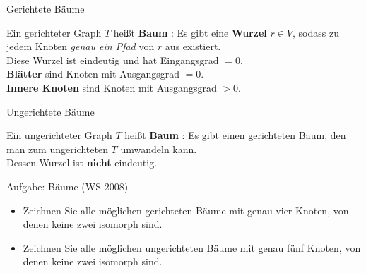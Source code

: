 \begin{frame}{Gerichtete Bäume}
	\begin{Definition}
		Ein gerichteter Graph $T$ heißt \textbf{Baum} :{\Gdw} Es gibt eine \textbf{Wurzel} $r \in V$, sodass zu jedem Knoten \emph{genau ein Pfad} von $r$ aus existiert. \\
		\smallskip
		Diese Wurzel ist eindeutig und hat Eingangsgrad $= 0$. \\
		\textbf{Blätter} sind Knoten mit Ausgangsgrad $= 0$. \\
		\textbf{Innere Knoten} sind Knoten mit Ausgangsgrad $> 0$. 
		
	\end{Definition}
\end{frame}

\begin{frame}{Ungerichtete Bäume}
	\begin{Definition}
		Ein ungerichteter Graph $T$ heißt \textbf{Baum} :{\Gdw} Es gibt einen gerichteten Baum, den man zum ungerichteten $T$ umwandeln kann. \\
		\smallskip
		Dessen Wurzel ist \textbf{nicht} eindeutig.
		
	\end{Definition}
\end{frame}

\begin{frame}{Aufgabe: Bäume (WS 2008)}
	\begin{itemize}	
		\item Zeichnen Sie alle möglichen gerichteten Bäume mit genau vier Knoten, von denen keine zwei isomorph sind.
		\item Zeichnen Sie alle möglichen ungerichteten Bäume mit genau fünf Knoten, von denen keine zwei isomorph sind.
	\end{itemize}
\end{frame}

